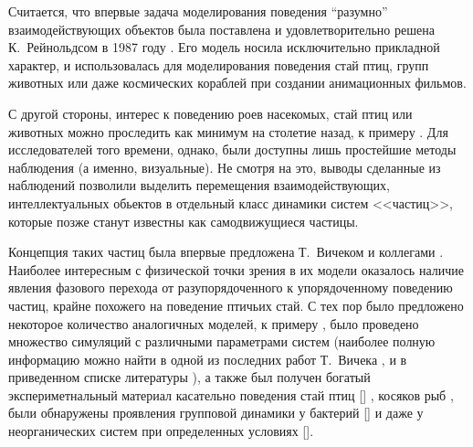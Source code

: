 
Считается, что впервые задача моделирования поведения ``разумно'' взаимодействующих объектов была поставлена и удовлетворительно решена К.~Рейнольдсом в 1987 году \cite{reynolds1987}. Его модель носила исключительно прикладной характер, и использовалась для моделирования поведения стай птиц, групп животных или даже космических кораблей при создании анимационных фильмов.

С другой стороны, интерес к поведению роев насекомых, стай птиц или животных можно проследить как минимум на столетие назад, к примеру \cite{selous1931}. Для исследователей того времени, однако, были доступны лишь простейшие методы наблюдения (а именно, визуальные). Не смотря на это, выводы сделанные из наблюдений позволили выделить перемещения взаимодействующих, интеллектуальных обьектов в отдельный класс динамики систем <<частиц>>, которые позже станут известны как самодвижущиеся частицы.%

Концепция таких частиц была впервые предложена Т.~Вичеком и коллегами \cite{vicsek1995}. Наиболее интересным с физической точки зрения в их модели оказалось наличие явления фазового перехода от разупорядоченного к упорядоченному поведению частиц, крайне похожего на поведение птичьих стай.
С тех пор было предложено некоторое количество аналогичных моделей, к примеру \cite{gregoire2004,schubring2013,kuemmel2013,huepe2008,chate2008,tu2000}, было проведено множество симуляций с различными параметрами систем (наиболее полную информацию можно найти в одной из последних работ Т.~Вичека \cite{vicsek2012}, и в приведенном списке литературы %
), а также был получен богатый экспериметнальный материал касательно поведения стай птиц [] %
, косяков рыб \cite{cambui2012}, были обнаружены проявления групповой динамики у бактерий [] и даже у неорганических систем при определенных условиях [].


